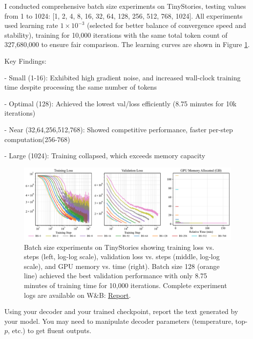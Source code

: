 \begin{answer}
I conducted comprehensive batch size experiments on TinyStories, testing values from 1 to 1024: [1, 2, 4, 8, 16, 32, 64, 128, 256, 512, 768, 1024]. All experiments used learning rate $1 \times 10^{-3}$ (selected for better balance of convergence speed and stability), training for 10,000 iterations with the same total token count of 327,680,000 to ensure fair comparison. The learning curves are shown in Figure \ref{fig:batch_size_experiments}.

Key Findings:

- {Small (1-16)}: Exhibited high gradient noise, and increased wall-clock training time despite processing the same number of tokens

- {Optimal (128)}: Achieved the lowest val/loss efficiently (8.75 minutes for 10k iterations)

- {Near (32,64,256,512,768)}: Showed competitive performance, faster per-step computation(256-768)

- {Large (1024)}: Training collapsed, which exceeds memory capacity

\begin{figure}[!htb]
    \centering
    \includegraphics[width=\textwidth]{images/batch_size_experiments.pdf}
    \caption{Batch size experiments on TinyStories showing training loss vs. steps (left, log-log scale), validation loss vs. steps (middle, log-log scale), and GPU memory vs. time (right). Batch size 128 (orange line) achieved the best validation performance with only 8.75 minutes of training time for 10,000 iterations. Complete experiment logs are available on W\&B: \href{https://api.wandb.ai/links/donglinkang2021-beijing-institute-of-technology/ejo2bn9n}{Report}.}
    \label{fig:batch_size_experiments}
\end{figure}

\end{answer}


Using your decoder and your trained checkpoint, report the text generated by your model. You may need to manipulate decoder parameters (temperature, top-$p$, etc.) to get fluent outputs.


